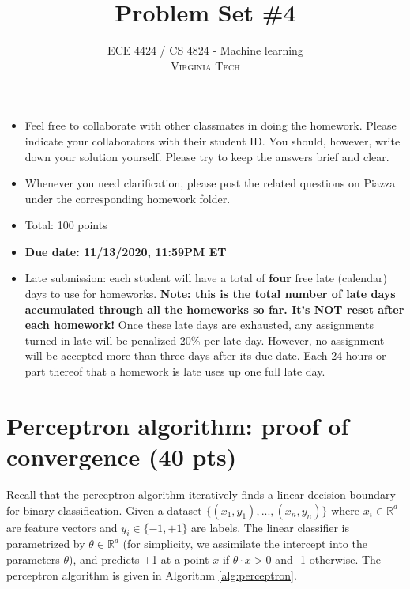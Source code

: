 \documentclass[12pt]{article}
\title{Problem Set \#4} %
\author{ECE 4424 / CS 4824 - Machine learning\\ %
\textsc{Virginia Tech}
}
\begin{document}


\setlength{\droptitle}{-5em}    
\maketitle


\begin{itemize}
    \item Feel free to collaborate with other classmates in doing the homework. Please indicate your collaborators with their student ID. You should, however, write down your solution yourself. Please try to keep the answers brief and clear.
    \item Whenever you need clarification, please post the related questions on Piazza under the corresponding homework folder.
    \item Total: 100 points
    \item \textbf{Due date: 11/13/2020, 11:59PM ET}
    \item Late submission: each student will have a total of \textbf{four} free late (calendar) days to use for homeworks. \textbf{Note: this is the total number of late days accumulated through all the homeworks so far. It's NOT reset after each homework!} Once these late days are exhausted, any assignments turned in late will be penalized 20\% per late day. However, no assignment will be accepted more than three days after its due date. Each 24 hours or part thereof that a homework is late uses up one full late day. 
\end{itemize}



\section{Perceptron algorithm: proof of convergence (40 pts)}
\label{sec:perceptron}

Recall that the perceptron algorithm iteratively finds a linear decision boundary for binary classification. Given a dataset $\{(x_{1},y_1),...,(x_n,y_n)\}$
where $x_{i} \in \mathbb{R}^{d}$ are feature vectors and $y_i\in\{-1,+1\}$ are labels.  The linear classifier is parametrized by $\theta\in \mathbb{R}^{d}$ (for simplicity, we assimilate the intercept into the parameters $\theta$), and predicts +1 at a point $x$ if $\theta\cdot x>0$ and -1 otherwise. The perceptron algorithm is given in Algorithm \ref{alg:perceptron}.
\end{document}
